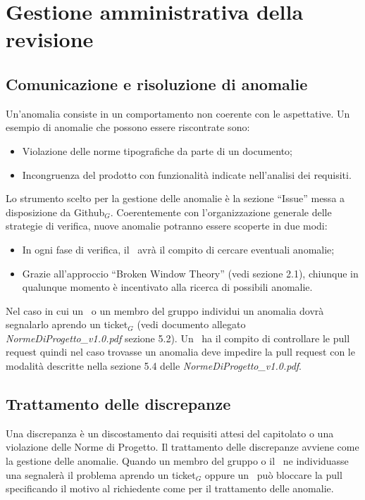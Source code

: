 \section{Gestione amministrativa della revisione}
\subsection{Comunicazione e risoluzione di anomalie}
Un'anomalia consiste in un comportamento non coerente con le aspettative. Un esempio di anomalie che possono essere riscontrate sono:
\begin{itemize}
	\item Violazione delle norme tipografiche da parte di un documento;
	\item Incongruenza del prodotto con funzionalità indicate nell'analisi dei requisiti.
\end{itemize}
Lo strumento scelto per la gestione delle anomalie è la sezione ``Issue'' messa a disposizione da Github$_G$. Coerentemente con l'organizzazione generale delle strategie di verifica, nuove anomalie potranno essere scoperte in due modi:

\begin{itemize}
	\item In ogni fase di verifica, il \ruoloVerificatore\ avrà il compito di cercare eventuali anomalie;
	\item Grazie all'approccio ``Broken Window Theory'' (vedi sezione 2.1), chiunque in qualunque momento è incentivato alla ricerca di possibili anomalie.
\end{itemize}
Nel caso in cui un \ruoloVerificatore\ o un membro del gruppo individui un anomalia dovrà segnalarlo aprendo un ticket$_G$ (vedi documento allegato \textit{NormeDiProgetto\_v1.0.pdf} sezione 5.2). Un \ruoloVerificatore\ ha il compito di controllare le pull request quindi nel caso trovasse un anomalia deve impedire la pull request con le modalità descritte nella sezione 5.4 delle \textit{NormeDiProgetto\_v1.0.pdf}.

\subsection{Trattamento delle discrepanze}
Una discrepanza è un discostamento dai requisiti attesi del capitolato o una violazione delle Norme di Progetto. Il trattamento delle discrepanze avviene come la gestione delle anomalie. Quando un membro del gruppo o il \ruoloVerificatore\ ne individuasse una segnalerà il problema aprendo un ticket$_G$ oppure un \ruoloVerificatore\ può bloccare la pull specificando il motivo al richiedente come per il trattamento delle anomalie.
\newpage\right 
